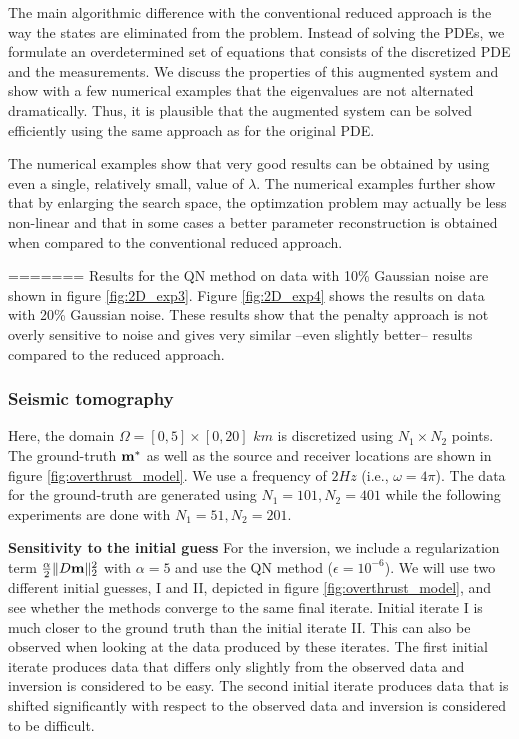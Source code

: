 \documentclass{iopart}
\begin{document}
{The main algorithmic difference with the conventional reduced approach is the way the states are eliminated from the problem.
Instead of solving the PDEs, we formulate an overdetermined set of equations that consists of the discretized PDE and the measurements.
We discuss the properties of this augmented system and show with a few numerical examples that the eigenvalues are not alternated dramatically.
Thus, it is plausible that the augmented system can be solved efficiently using the same approach as for the original PDE.

The numerical examples show that
very good results can be obtained by using even a single, relatively small, value of $\lambda$.
The numerical examples further show that by enlarging the search space, the optimzation problem
may actually be less non-linear and that in some cases a better parameter reconstruction 
is obtained when compared to the conventional reduced approach.

=======
Results for the QN method on data with 10\% Gaussian noise are shown in figure  \ref{fig:2D_exp3}. Figure \ref{fig:2D_exp4} shows the results on data with 20\% Gaussian noise. These results show that the penalty approach is not overly sensitive to noise and gives very similar --even slightly better-- results compared to the reduced approach.

\subsubsection{Seismic tomography}
Here, the domain $\Omega = [0,5]\times [0,20]$ $km$ is discretized using $N_1\times N_2$ points. The ground-truth $\mathbf{m}^*$ as well as the source and receiver locations are shown in figure \ref{fig:overthrust_model}. We use a frequency of $2 Hz$ (i.e., $\omega = 4\pi$). The data for the ground-truth are generated using $N_1=101, N_2=401$ while the following experiments are done with $N_1=51, N_2=201$. 

\textbf{Sensitivity to the initial guess}
For the inversion, we include a regularization term $\frac{\alpha}{2} \|D\mathbf{m}\|_2^2$ with $\alpha = 5$ and use the QN method ($\epsilon=10^{-6}$). We will use two different initial guesses, I and II, depicted in figure \ref{fig:overthrust_model}, and see whether the methods converge to the same final iterate. Initial iterate I is much closer to the ground truth than the initial iterate II. This can also be observed when looking at the data produced by these iterates. The first initial iterate produces data that differs only slightly from the observed data and inversion is considered to be easy. The second initial iterate produces data that is shifted significantly with respect to the observed data and inversion is considered to be difficult.

}
\end{document}
